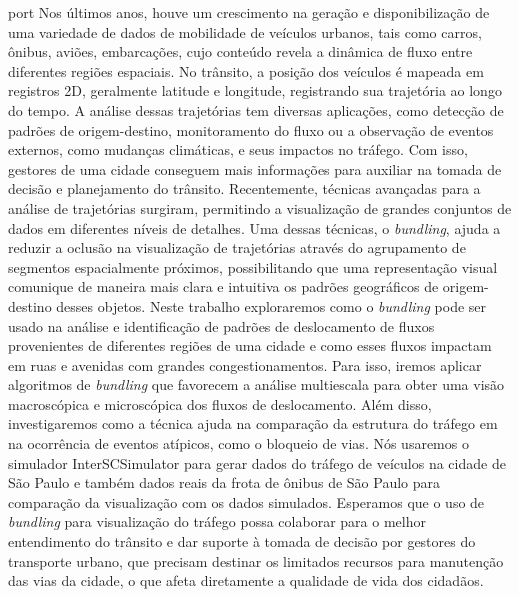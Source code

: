 
\begin{resumo}{port}
  Nos últimos anos, houve um crescimento na geração e disponibilização de uma
variedade de dados de mobilidade de veículos urbanos, tais como carros, ônibus, aviões, embarcações,
cujo conteúdo revela a dinâmica de fluxo entre diferentes regiões espaciais. No
trânsito, a posição dos veículos é mapeada em registros 2D, geralmente latitude
e longitude, registrando sua trajetória ao longo do tempo. A análise dessas
trajetórias tem diversas aplicações, como detecção de padrões de
origem-destino, monitoramento do fluxo ou a observação de eventos externos,
como mudanças climáticas, e seus impactos no tráfego. Com isso, gestores de uma
cidade conseguem mais informações para auxiliar na tomada de decisão e
planejamento do trânsito. Recentemente, técnicas avançadas para a análise de
trajetórias surgiram, permitindo a visualização de grandes conjuntos de dados
em diferentes níveis de detalhes. Uma dessas técnicas, o \emph{bundling},  ajuda a
reduzir a oclusão na visualização de trajetórias através do agrupamento de
segmentos espacialmente próximos, possibilitando que uma representação visual
comunique de maneira mais clara e intuitiva os padrões geográficos de
origem-destino desses objetos. Neste trabalho exploraremos como o \emph{bundling} pode
ser usado na análise e identificação de padrões de deslocamento de fluxos
provenientes de diferentes regiões de uma cidade e como esses fluxos impactam
em ruas e avenidas com grandes congestionamentos. Para isso, iremos aplicar
algoritmos de \emph{bundling} que favorecem a análise multiescala para obter uma
visão macroscópica e microscópica dos fluxos de deslocamento. Além disso,
investigaremos como a técnica ajuda na comparação da estrutura do tráfego em
na ocorrência de eventos atípicos, como o bloqueio de vias. Nós usaremos o simulador
InterSCSimulator para gerar dados do tráfego de veículos na
cidade de São Paulo e também dados reais da frota de ônibus de São Paulo para
comparação da visualização com os dados simulados. Esperamos que o uso de
\emph{bundling} para visualização do tráfego possa colaborar  para o melhor
entendimento do trânsito e dar suporte à tomada de decisão por gestores do
transporte urbano, que precisam destinar os limitados recursos para manutenção
das vias da cidade, o que afeta diretamente a qualidade de vida dos cidadãos.
\end{resumo}

